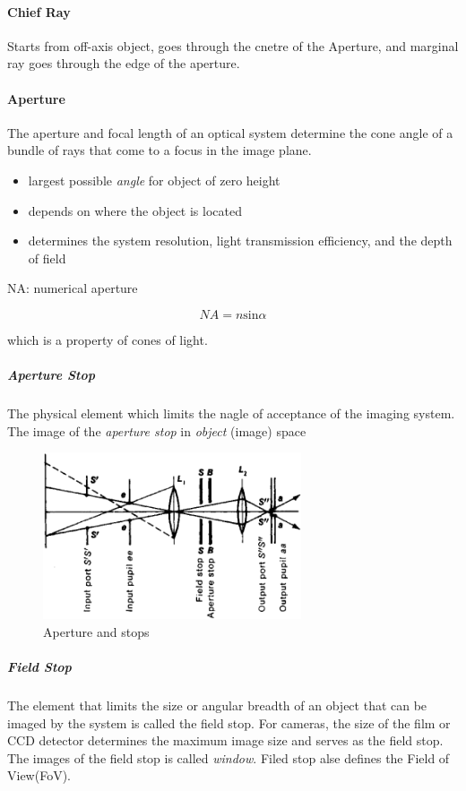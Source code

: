 \paragraph{Chief Ray} Starts from off-axis object, goes through the cnetre of the Aperture, and marginal ray goes through the edge of the aperture.

\paragraph{Aperture}

The aperture and focal length of an optical system determine the cone angle of a bundle of rays that come to a focus in the image plane.

\begin{itemize}
  \item largest possible \emph{angle} for object of zero height
  \item depends on where the object is located
  \item determines the system resolution, light transmission efficiency, and the depth of field
\end{itemize}

NA: numerical aperture

$$NA=n\textrm{sin}\alpha $$

which is a property of cones of light.

\subparagraph{Aperture Stop} The physical element which limits the nagle of acceptance of the imaging system. The image of the \emph{aperture stop} in \emph{object} (image) space

\begin{figure}
  \centering
  \includegraphics[width=3.0in]{fig/gsed_0001_0015_0_img3897.png}
  \caption{Aperture and stops}\label{fig_Aperture_and_stops}
\end{figure}

\subparagraph{Field Stop} The element that limits the size or angular breadth of an object that can be imaged by the system is called the field stop. For cameras, the size of the film or CCD detector determines the maximum image size and serves as the field stop. The images of the field stop is called \emph{window}. Filed stop alse defines the Field of View(FoV).


